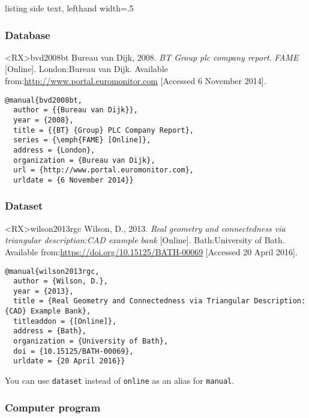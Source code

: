 \documentclass[10pt,a4paper]{article}
\newenvironment{info}{%
  \begin{list}{\makebox[2em][c]{\faInfoCircle}}{%
    \setlength{\leftmargin}{2em}
    \setlength{\labelwidth}{2em}
    \setlength{\labelsep}{0pt}}
}{\end{list}}
\begin{document}
\begin{tcblisting}{listing side text, lefthand width=.5\linewidth}
\citetext{\citeauthor[2004]{clark2004euk}}
\end{tcblisting}

\subsubsection*{Database}

\begin{bibexbox}<RX>{bvd2008bt}
  Bureau van Dijk, 2008. \emph{BT Group plc company report}. \emph{FAME} [Online]. London:\@ Bureau van Dijk. Available from:\@ \url{http://www.portal.euromonitor.com} [Accessed 6 November 2014].
  \tcblower
\begin{Verbatim}
@manual{bvd2008bt,
  author = {{Bureau van Dijk}},
  year = {2008},
  title = {{BT} {Group} PLC Company Report},
  series = {\emph{FAME} [Online]},
  address = {London},
  organization = {Bureau van Dijk},
  url = {http://www.portal.euromonitor.com},
  urldate = {6 November 2014}}
\end{Verbatim}
\end{bibexbox}

\subsubsection*{Dataset}

\begin{bibexbox}<RX>{wilson2013rgc}
  Wilson, D., 2013. \emph{Real geometry and connectedness via triangular description:\@ CAD example bank} [Online]. Bath:\@ University of Bath. Available from:\@ \url{https://doi.org/10.15125/BATH-00069} [Accessed 20 April 2016].
  \tcblower
\begin{Verbatim}
@manual{wilson2013rgc,
  author = {Wilson, D.},
  year = {2013},
  title = {Real Geometry and Connectedness via Triangular Description: {CAD} Example Bank},
  titleaddon = {[Online]},
  address = {Bath},
  organization = {University of Bath},
  doi = {10.15125/BATH-00069},
  urldate = {20 April 2016}}
\end{Verbatim}
\end{bibexbox}

\begin{info}\item You can use \texttt{dataset} instead of \texttt{online} as an alias for \texttt{manual}.\end{info}

\subsubsection*{Computer program}
\end{document}
